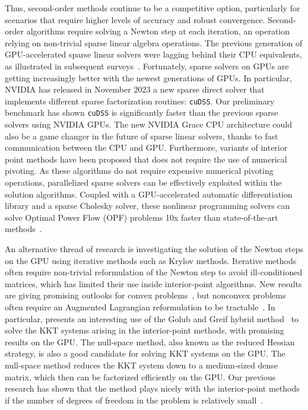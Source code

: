 Thus, second-order methods continue to be a competitive option, particularly
for scenarios that require higher levels of accuracy and robust convergence.
Second-order algorithms require solving a Newton step at each
iteration, an operation relying on non-trivial sparse linear algebra operations.
The previous generation of GPU-accelerated sparse linear
solvers were lagging behind their CPU equivalents, as illustrated in
subsequent surveys~\cite{tasseff2019exploring,swirydowicz2021linear}.
Fortunately, sparse solvers on GPUs are getting increasingly better with the newest
generations of GPUs.
In particular, NVIDIA has released in November 2023
a new sparse direct solver that implements different sparse factorization routines: {\tt cuDSS}. Our
preliminary benchmark has shown {\tt cuDSS} is significantly
faster than the previous sparse solvers using NVIDIA GPUs.
The new NVIDIA Grace CPU architecture could also be a game changer in the future of sparse linear solvers, thanks to fast communication between the CPU and GPU.
Furthermore, variants of interior point methods have been proposed
that does not require the use of numerical pivoting.
As these algorithms do not require expensive numerical pivoting
operations, parallelized sparse solvers can be effectively exploited
within the solution algorithms.
Coupled with a GPU-accelerated automatic differentiation library and a
sparse Cholesky solver, these nonlinear programming solvers can solve
Optimal Power Flow (OPF) problems 10x faster than state-of-the-art
methods~\cite{shin2023accelerating}.

An alternative thread of research is investigating the solution of the Newton steps
on the GPU using iterative methods such as Krylov methods.
Iterative methods often require non-trivial reformulation of the Newton step to avoid
ill-conditioned matrices, which has limited their use inside interior-point
algorithms. New results are giving promising outlooks for convex problems~\cite{ghannad2022linear},
but nonconvex problems often require an Augmented Lagrangian reformulation
to be tractable~\cite{cao2016augmented,regev2023hykkt}. In particular,
\cite{regev2023hykkt} presents an interesting use of the Golub and Greif
hybrid method~\cite{golub2003solving} to solve the KKT systems arising in
the interior-point methods, with promising results on the GPU.
The null-space method, also known as the reduced Hessian strategy,
is also a good candidate for solving KKT systems on the GPU.
The null-space method reduces the KKT system down to
a medium-sized dense matrix, which then can be factorized efficiently on the GPU.
Our previous research has shown that the method plays nicely with the interior-point
methods if the number of degrees of freedom in the problem is relatively small~\cite{pacaud2022condensed}.

